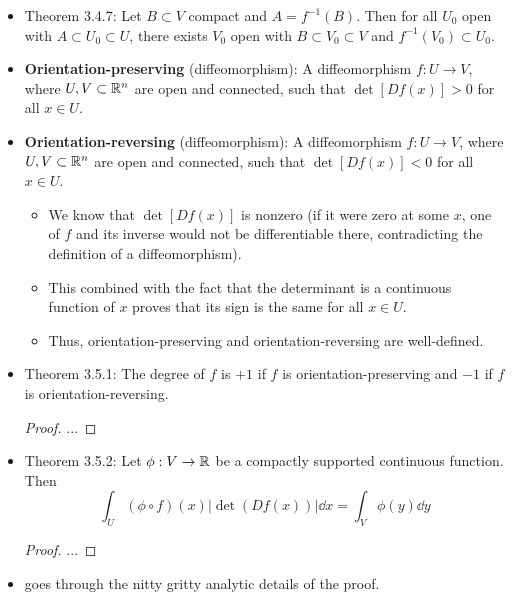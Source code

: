 \documentclass[../notes.tex]{subfiles}
\begin{document}
\begin{itemize}
\begin{itemize}
    \end{itemize}
    \item Theorem 3.4.7: Let $B\subset V$ compact and $A=f^{-1}(B)$. Then for all $U_0$ open with $A\subset U_0\subset U$, there exists $V_0$ open with $B\subset V_0\subset V$ and $f^{-1}(V_0)\subset U_0$.
    \item \textbf{Orientation-preserving} (diffeomorphism): A diffeomorphism $f:U\to V$, where $U,V\subset\mathbb{R}^n$ are open and connected, such that $\det[Df(x)]>0$ for all $x\in U$.
    \item \textbf{Orientation-reversing} (diffeomorphism): A diffeomorphism $f:U\to V$, where $U,V\subset\mathbb{R}^n$ are open and connected, such that $\det[Df(x)]<0$ for all $x\in U$.
    \begin{itemize}
        \item We know that $\det[Df(x)]$ is nonzero (if it were zero at some $x$, one of $f$ and its inverse would not be differentiable there, contradicting the definition of a diffeomorphism).
        \item This combined with the fact that the determinant is a continuous function of $x$ proves that its sign is the same for all $x\in U$.
        \item Thus, orientation-preserving and orientation-reversing are well-defined.
    \end{itemize}
    \item Theorem 3.5.1: The degree of $f$ is $+1$ if $f$ is orientation-preserving and $-1$ if $f$ is orientation-reversing.
    \begin{proof}
        ...
    \end{proof}
    \item Theorem 3.5.2: Let $\phi:V\to\mathbb{R}$ be a compactly supported continuous function. Then
    \begin{equation*}
        \int_U(\phi\circ f)(x)|\det(Df(x))|\dd{x} = \int_V\phi(y)\dd{y}
    \end{equation*}
    \begin{proof}
        ...
    \end{proof}
    \item \textcite{bib:DifferentialForms} goes through the nitty gritty analytic details of the proof.
\end{itemize}
\end{document}
